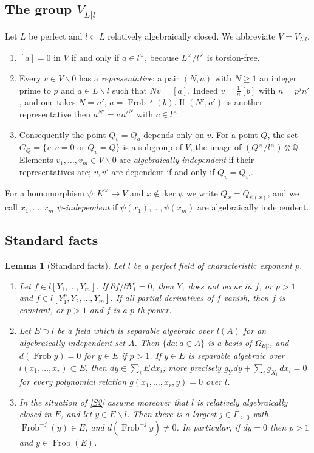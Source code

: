 \documentclass[11pt]{amsart}
\newtheorem{lemma}[theorem]{Lemma}
\theoremstyle{definition}
\theoremstyle{remark}
\newcommand{\QQ}{\mathbb{Q}}
\newcommand{\Frob}{\operatorname{Frob}}
\newcommand{\sm}{\smallsetminus}
\begin{document}
\subsection{The group \texorpdfstring{$V_{L|l}$}{V}}\label{ss:V}
Let $L$ be perfect and $l\subset L$ relatively algebraically closed. We abbreviate $V=V_{L|l}$.
\begin{enumerate}[label=\textup{(V\arabic*)}]
\item\label{V1} $[a]=0$ in $V$ if and only if $a\in l^\times$, because $L^\times/l^\times$ is torsion-free.
\item\label{V2} Every $v\in V\sm0$ has a \emph{representative}: a pair $(N,a)$ with $N\ge1$ an integer prime to $p$ and $a\in L\sm l$ such that $Nv=[a]$.
Indeed $v=\frac1n[b]$ with $n=p^jn'$, and one takes $N=n'$, $a=\Frob^{-j}(b)$. If $(N',a')$ is another representative then $a^{N'}=c\,a'^{N}$ with $c\in l^\times$.
\item\label{V3} Consequently the point $Q_v=Q_a$ depends only on $v$. For a point $Q$, the set $G_Q=\{v: v=0\text{ or }Q_v=Q\}$ is a subgroup of $V$, the image of $(Q^\times/l^\times)\otimes\QQ$.
Elements $v_1,\dots,v_m\in V\sm0$ are \emph{algebraically independent} if their representatives are; $v,v'$ are dependent if and only if $Q_v=Q_{v'}$.
\end{enumerate}
For a homomorphism $\psi\colon K^\times\to V$ and $x\notin\ker\psi$ we write $Q_x=Q_{\psi(x)}$, and we call $x_1,\dots,x_m$ \emph{$\psi$-independent} if $\psi(x_1),\dots,\psi(x_m)$ are algebraically independent.


\subsection{Standard facts}
\begin{lemma}[Standard facts]\label{lem:standard}
Let $l$ be a perfect field of characteristic exponent $p$.
\begin{enumerate}[label=\textup{(S\arabic*)}]
\item\label{S1} Let $f\in l[Y_1,\dots,Y_m]$. If $\partial f/\partial Y_1=0$, then $Y_1$ does not occur in $f$, or $p>1$ and $f\in l[Y_1^p,Y_2,\dots,Y_m]$.
If all partial derivatives of $f$ vanish, then $f$ is constant, or $p>1$ and $f$ is a $p$-th power.
\item\label{S2} Let $E\supset l$ be a field which is separable algebraic over $l(A)$ for an algebraically independent set $A$. Then $\{da:a\in A\}$ is a basis of $\Omega_{E|l}$, and $d(\Frob y)=0$ for $y\in E$ if $p>1$.
If $y\in E$ is separable algebraic over $l(x_1,\dots,x_r)\subset E$, then $dy\in\sum_iE\,dx_i$; more precisely $g_Y\,dy+\sum_ig_{X_i}\,dx_i=0$ for every polynomial relation $g(x_1,\dots,x_r,y)=0$ over $l$.
\item\label{S3} In the situation of \ref{S2} assume moreover that $l$ is relatively algebraically closed in $E$, and let $y\in E\sm l$. Then there is a largest $j\in\Gamma_{\ge0}$ with $\Frob^{-j}(y)\in E$, and $d(\Frob^{-j}y)\neq0$.
In particular, if $dy=0$ then $p>1$ and $y\in\Frob(E)$.
\end{enumerate}
\end{lemma}
\end{document}
